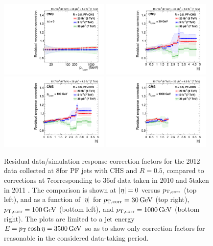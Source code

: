 \documentclass[11pt,twoside,a4paper,cmspaper,final,collab]{cms-tdr}
\begin{document}
\begin{figure}[htbp!]
\centering
\includegraphics[width=0.48\textwidth]{Figure_027-a.pdf}
\includegraphics[width=0.48\textwidth]{Figure_027-b.pdf}
\includegraphics[width=0.48\textwidth]{Figure_027-c.pdf}
\includegraphics[width=0.48\textwidth]{Figure_027-d.pdf}
\caption{\label{fig:l2l3res}
Residual data/simulation response correction factors for the 2012 data collected at 8\TeV for PF jets with CHS and $R=0.5$, compared to corrections at 7\TeV corresponding to 36\pbinv of data taken in 2010 \cite{JEC_JINST} and 5\fbinv taken in 2011 \cite{CMS-DP-2012-006}. The comparison is shown at $\lvert \eta \rvert=0$ versus $p_{\mathrm{T},\rm corr}$ (top left), and as a function of $\lvert \eta \rvert$ for $p_{\mathrm{T},\rm corr}=30\,\text{Ge\hspace{-.08em}V}$ (top right), $p_{\mathrm{T},\rm corr}=100\,\text{Ge\hspace{-.08em}V}$ (bottom left), and $p_{\mathrm{T}, \rm corr}=1000\,\text{Ge\hspace{-.08em}V}$ (bottom right). The plots are limited to a jet energy $E=p_{\mathrm{T}}\cosh\eta=3500\,\text{Ge\hspace{-.08em}V}$ so as to show only correction factors for reasonable \pt in the considered data-taking period.}
\end{figure}
\end{document}
